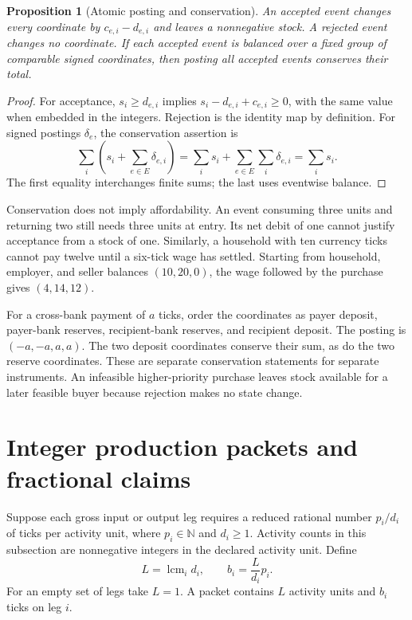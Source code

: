 \documentclass[11pt,a4paper]{article}
\newtheorem{proposition}[theorem]{Proposition}
\begin{document}
\begin{proposition}[Atomic posting and conservation]
An accepted event changes every coordinate by $c_{e,i}-d_{e,i}$ and leaves a nonnegative stock. A rejected event changes no coordinate. If each accepted event is balanced over a fixed group of comparable signed coordinates, then posting all accepted events conserves their total.
\end{proposition}
\begin{proof}
For acceptance, $s_i\geq d_{e,i}$ implies $s_i-d_{e,i}+c_{e,i}\geq0$, with the same value when embedded in the integers. Rejection is the identity map by definition. For signed postings $\delta_e$, the conservation assertion is
\begin{equation}
\sum_i\left(s_i+\sum_{e\in E}\delta_{e,i}\right)
=\sum_i s_i+\sum_{e\in E}\sum_i\delta_{e,i}
=\sum_i s_i.
\end{equation}
The first equality interchanges finite sums; the last uses eventwise balance.
\end{proof}

Conservation does not imply affordability. An event consuming three units and returning two still needs three units at entry. Its net debit of one cannot justify acceptance from a stock of one. Similarly, a household with ten currency ticks cannot pay twelve until a six-tick wage has settled. Starting from household, employer, and seller balances $(10,20,0)$, the wage followed by the purchase gives $(4,14,12)$.

For a cross-bank payment of $a$ ticks, order the coordinates as payer deposit, payer-bank reserves, recipient-bank reserves, and recipient deposit. The posting is $(-a,-a,a,a)$. The two deposit coordinates conserve their sum, as do the two reserve coordinates. These are separate conservation statements for separate instruments. An infeasible higher-priority purchase leaves stock available for a later feasible buyer because rejection makes no state change.

\section{Integer production packets and fractional claims}
Suppose each gross input or output leg requires a reduced rational number $p_i/d_i$ of ticks per activity unit, where $p_i\in\mathbb N$ and $d_i\geq1$. Activity counts in this subsection are nonnegative integers in the declared activity unit. Define
\begin{equation}
L=\operatorname{lcm}_i d_i,\qquad b_i=\frac{L}{d_i}p_i.
\end{equation}
For an empty set of legs take $L=1$. A packet contains $L$ activity units and $b_i$ ticks on leg $i$.
\end{document}

